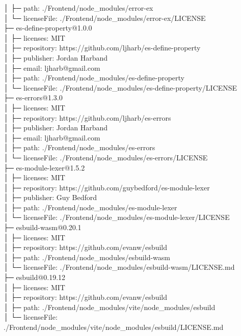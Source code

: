 │  ├─ path: ./Frontend/node\_modules/error-ex\\
│  └─ licenseFile: ./Frontend/node\_modules/error-ex/LICENSE\\
├─ es-define-property@1.0.0\\
│  ├─ licenses: MIT\\
│  ├─ repository: https://github.com/ljharb/es-define-property\\
│  ├─ publisher: Jordan Harband\\
│  ├─ email: ljharb@gmail.com\\
│  ├─ path: ./Frontend/node\_modules/es-define-property\\
│  └─ licenseFile: ./Frontend/node\_modules/es-define-property/LICENSE\\
├─ es-errors@1.3.0\\
│  ├─ licenses: MIT\\
│  ├─ repository: https://github.com/ljharb/es-errors\\
│  ├─ publisher: Jordan Harband\\
│  ├─ email: ljharb@gmail.com\\
│  ├─ path: ./Frontend/node\_modules/es-errors\\
│  └─ licenseFile: ./Frontend/node\_modules/es-errors/LICENSE\\
├─ es-module-lexer@1.5.2\\
│  ├─ licenses: MIT\\
│  ├─ repository: https://github.com/guybedford/es-module-lexer\\
│  ├─ publisher: Guy Bedford\\
│  ├─ path: ./Frontend/node\_modules/es-module-lexer\\
│  └─ licenseFile: ./Frontend/node\_modules/es-module-lexer/LICENSE\\
├─ esbuild-wasm@0.20.1\\
│  ├─ licenses: MIT\\
│  ├─ repository: https://github.com/evanw/esbuild\\
│  ├─ path: ./Frontend/node\_modules/esbuild-wasm\\
│  └─ licenseFile: ./Frontend/node\_modules/esbuild-wasm/LICENSE.md\\
├─ esbuild@0.19.12\\
│  ├─ licenses: MIT\\
│  ├─ repository: https://github.com/evanw/esbuild\\
│  ├─ path: ./Frontend/node\_modules/vite/node\_modules/esbuild\\
│  └─ licenseFile: ./Frontend/node\_modules/vite/node\_modules/esbuild/LICENSE.md\\
